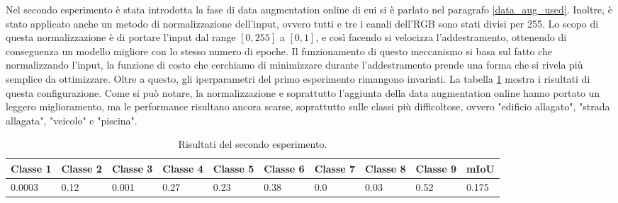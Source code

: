 Nel secondo esperimento è stata introdotta la fase di data augmentation online di cui si è parlato nel paragrafo \ref{data_aug_used}. Inoltre, è stato applicato anche un metodo di normalizzazione dell'input, ovvero tutti e tre i canali dell'RGB sono stati divisi per 255. Lo scopo di questa normalizzazione è di portare l'input dal range $[0, 255]$ a $[0, 1]$,  e così facendo si velocizza l'addestramento, ottenendo di conseguenza un modello migliore con lo stesso numero di epoche. Il funzionamento di questo meccanismo si basa sul fatto che normalizzando l'input, la funzione di costo che cerchiamo di minimizzare durante l'addestramento prende una forma che si rivela più semplice da ottimizzare. Oltre a questo, gli iperparametri del primo esperimento rimangono invariati. La tabella \ref{table:config5_mIoU} mostra i risultati di questa configurazione. Come si può notare, la normalizzazione e soprattutto l'aggiunta della data augmentation online hanno portato un leggero miglioramento, ma le performance risultano ancora scarse, soprattutto sulle classi più difficoltose, ovvero "edificio allagato", "strada allagata", "veicolo" e "piscina".

\begin{table}[h!]
\hspace{-0.1in}
\begin{tabular}{||p{1cm} p{1cm} p{1cm} p{1cm} p{1cm} p{1cm} p{1cm} p{1cm} p{1cm} | p{1cm}||}
 \hline
    Classe 1 & Classe 2 & Classe 3 & Classe 4 & Classe 5 & Classe 6 & Classe 7 & Classe 8 & Classe 9 & mIoU \\ [0.5ex]
 \hline
0.0003 & 0.12 & 0.001 & 0.27 &  0.23 & 0.38 & 0.0 & 0.03 & 0.52 & 0.175 \\ [1ex] 
 \hline
\end{tabular}
\caption{Risultati del secondo esperimento.}
\label{table:config5_mIoU}
\end{table}

